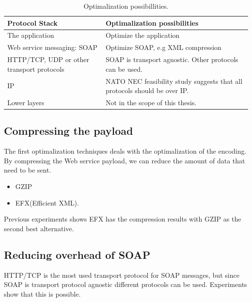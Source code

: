 \documentclass[USenglish]{article}
\begin{document}
\begin{table}[h]
\begin{tabularx}{\textwidth}{| X | X |}
\hline
  \textbf{Protocol Stack} & \textbf{Optimalization possibilities} \\ \hline
  The application & Optimize the application\\ \hline
  Web service messaging: SOAP & Optimize SOAP, e.g XML compression \\ \hline
  HTTP/TCP, UDP or other transport protocols & SOAP is transport agnostic. Other protocols can be used. \\ \hline
  IP & NATO NEC feasibility study suggests that all protocols should be over IP. \\ \hline
  Lower layers & Not in the scope of this thesis. \\ \hline
\end{tabularx}
\caption{Optimalization possibillities.} \label{table:optimalization-overview}
\end{table}


\subsection{Compressing the payload}
The first optimalization techniques deals with the optimalization of the encoding. By compressing the Web service payload, we can reduce the amount of data that need to be sent.
\begin{itemize}
\item GZIP
\item EFX(Efficient XML).
\end{itemize}
Previous experiments shows EFX has the compression results with GZIP as the second best alternative\cite{johnsen-trude-compression-techniqes}.

\subsection{Reducing overhead of SOAP}
HTTP/TCP is the most used transport protocol for SOAP messages, but since SOAP is transport protocol agnostic different protocols can be used. Experiments show that this is possible.
\end{document}
